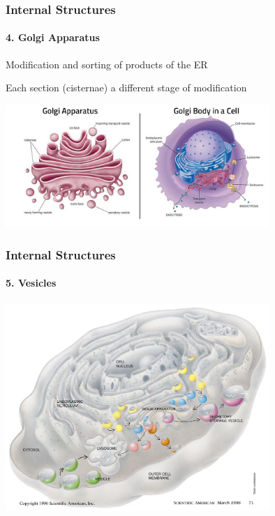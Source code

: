 \documentclass[10pt]{beamer}
\begin{document}
\begin{frame}[t]
\frametitle{Internal Structures}
\framesubtitle{4. Golgi Apparatus}
\vspace{0.5cm}

	Modification and sorting of products of the ER\\
	
	\vspace{0.5cm}
	
	Each section (cisternae) a different stage of modification\\
	
	\vspace{0.2cm}
	
	\begin{center}
		\includegraphics[width=0.75\textwidth]{figures/golgi.jpg}
	\end{center}

\end{frame}


\begin{frame}[t]
\frametitle{Internal Structures}
\framesubtitle{5. Vesicles}
\vspace{0.5cm}

	
	\begin{center}
		\includegraphics[width=0.75\textwidth]{figures/vesicles.jpg}
	\end{center}

\end{frame}
\end{document}

